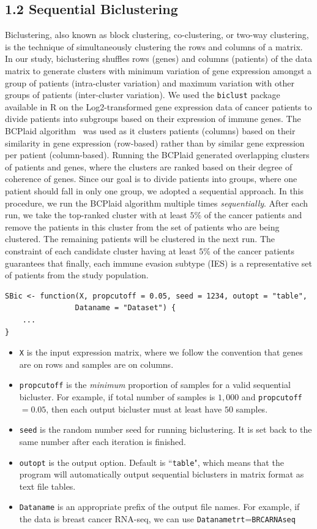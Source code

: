 \documentclass[a4paper, 11pt]{article}
\begin{document}
\subsection*{1.2 Sequential Biclustering}
Biclustering, also known as block clustering, co-clustering, or two-way clustering, is the technique of simultaneously clustering the rows and columns of a matrix. In our study, biclustering shuffles rows (genes) and columns (patients) of the data matrix to generate clusters with minimum variation of gene expression amongst a group of patients (intra-cluster variation) and maximum variation with other groups of patients (inter-cluster variation). We used the \texttt{biclust} package available in R on the Log2-transformed gene expression data of cancer patients to divide patients into subgroups based on their expression of immune genes. The BCPlaid algorithm~\citep{turner2005improved, lazzeroni2002plaid} was used as it clusters patients (columns) based on their similarity in gene expression (row-based) rather than by similar gene expression per patient (column-based). Running the BCPlaid generated overlapping clusters of patients and genes, where the clusters are ranked based on their degree of coherence of genes. Since our goal is to divide patients into groups, where one patient should fall in only one group, we adopted a sequential approach. In this procedure, we run the BCPlaid algorithm multiple times \textit{sequentially}. After each run, we take the top-ranked cluster with at least $5$\% of the cancer patients and remove the patients in this cluster from the set of patients who are being clustered. The remaining patients will be clustered in the next run. The constraint of each candidate cluster having at least $5$\% of the cancer patients guarantees that finally, each immune evasion subtype (IES) is a representative set of patients from the study population.
\begin{lstlisting}
SBic <- function(X, propcutoff = 0.05, seed = 1234, outopt = "table", 
				Dataname = "Dataset") {
	...
}
\end{lstlisting}
\begin{itemize}
\item \texttt{X} is the input expression matrix, where we follow the convention that genes are on rows and samples are on columns.
\item \texttt{propcutoff} is the \textit{minimum} proportion of samples for a valid sequential bicluster. For example, if total number of samples is $1,000$ and \texttt{propcutoff}$=0.05$, then each output bicluster must at least have $50$ samples.
\item \texttt{seed} is the random number seed for running biclustering. It is set back to the same number after each iteration is finished.
\item \texttt{outopt} is the output option. Default is ``\texttt{table}", which means that the program will automatically output sequential biclusters in matrix format as text file tables.
\item \texttt{Dataname} is an appropriate prefix of the output file names. For example, if the data is breast cancer RNA-seq, we can use \texttt{Datanametrt}=\texttt{BRCARNAseq}
\end{itemize}
\end{document}
